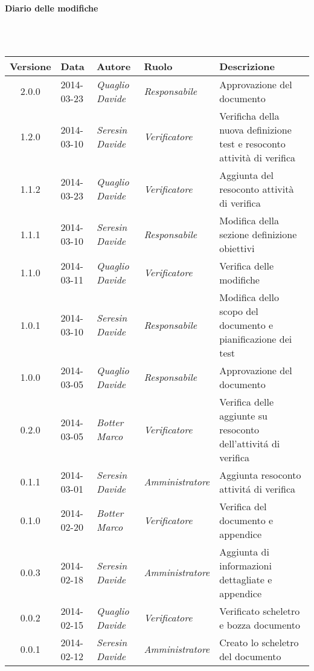 \noindent\begin{Large}\textbf{Diario delle modifiche}\end{Large}\\
\\
\begin{small}
\begin{tabular}{|c|p{1.8cm}|p{2.8cm}|p{2.8cm}|p{3.5cm}|}
\hline
Versione & Data & Autore & Ruolo & Descrizione \\
\hline
\hline
2.0.0 & 2014-03-23 & 
\textit{Quaglio Davide} &
\textit{Responsabile} &  Approvazione del documento\\
\hline
1.2.0 & 2014-03-10 & 
\textit{Seresin Davide} &
\textit{Verificatore} &  Verificha della nuova definizione test e resoconto attività di verifica\\
\hline
1.1.2 & 2014-03-23 & 
\textit{Quaglio Davide} &
\textit{Verificatore} &  Aggiunta del resoconto attività di verifica\\
\hline
1.1.1 & 2014-03-10 & 
\textit{Seresin Davide} &
\textit{Responsabile} &  Modifica della sezione definizione obiettivi\\
\hline
1.1.0 & 2014-03-11 & 
\textit{Quaglio Davide} &
\textit{Verificatore} &  Verifica delle modifiche\\
\hline
1.0.1 & 2014-03-10 & 
\textit{Seresin Davide} &
\textit{Responsabile} &  Modifica dello scopo del documento e pianificazione dei test\\
\hline
1.0.0 & 2014-03-05 & 
\textit{Quaglio Davide} &
\textit{Responsabile} &  Approvazione del documento\\
\hline
0.2.0 & 2014-03-05 & 
\textit{Botter Marco} &
\textit{Verificatore} &  Verifica delle aggiunte su resoconto dell'attivit\'a di verifica\\
\hline
0.1.1 & 2014-03-01 & 
\textit{Seresin Davide} &
\textit{Amministratore} &  Aggiunta resoconto attivit\'a di verifica\\
\hline
0.1.0 & 2014-02-20 & 
\textit{Botter Marco} &
\textit{Verificatore} &  Verifica del documento e appendice\\
\hline
0.0.3 & 2014-02-18 & 
\textit{Seresin Davide} &
\textit{Amministratore} &  Aggiunta di informazioni dettagliate e appendice\\
\hline
0.0.2 & 2014-02-15 & 
\textit{Quaglio Davide} &
\textit{Verificatore} &  Verificato scheletro e bozza documento\\
\hline
0.0.1 & 2014-02-12 & 
\textit{Seresin Davide} &
\textit{Amministratore} &  Creato lo scheletro del documento\\
\hline
\end{tabular}\\
\end{small}